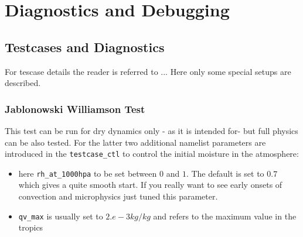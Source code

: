 %

\chapter{Diagnostics and Debugging}


\section{Testcases and Diagnostics}

For tescase details the reader is referred to ... Here only some
special setups are described.


\subsection{Jablonowski Williamson Test}
This test can be run for dry dynamics only - as it is intended for-
but full physics can be also tested. For the latter two additional
namelist parameters are introduced in the  \texttt{testcase\_ctl} to control the initial moisture in
the atmosphere:
\begin{itemize}
\item here \texttt{rh\_at\_1000hpa} to be set between $0$ and $1$. The
default is set to $0.7$ which gives a quite smooth start. If you
really want to see early onsets of convection and microphysics just
tuned this parameter.
\item \texttt{qv\_max} is usually set to $2.e-3 kg/kg$ and refers to
the maximum value in the tropics
\end{itemize}

